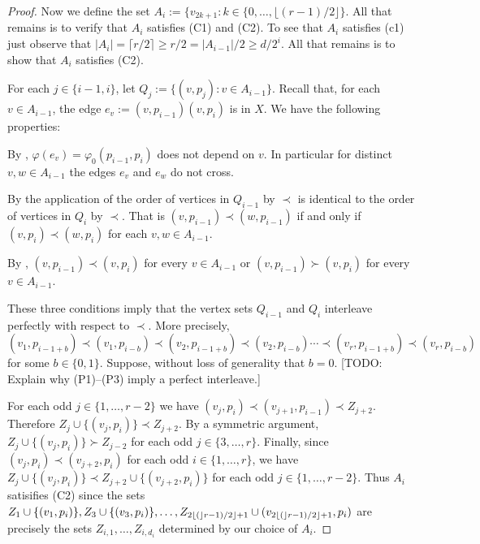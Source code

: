 \documentclass[kpfonts]{patmorin}
\renewcommand{\ge}{\geqslant}
\begin{document}
\begin{proof}
    Now we define the set $A_i:=\{v_{2k+1}:k\in\{0,\ldots,\lfloor(r-1)/2\rfloor\}$.  All that remains is to verify that $A_i$ satisfies (C1) and (C2).  To see that $A_i$ satisfies (c1) just observe that $|A_i|=\lceil r/2\rceil \ge r/2= |A_{i-1}|/2\ge d/2^{i}$.  All that remains is to show that $A_i$ satisfies (C2).

    For each $j\in\{i-1,i\}$, let $Q_j:=\{(v,p_j):v\in A_{i-1}\}$.
    Recall that, for each $v\in A_{i-1}$, the edge $e_v:=(v,p_{i-1})(v,p_i)$ is in $X$.  We have the following properties:
    \begin{compactenum}[(P1)]
        \item By , $\varphi(e_v)=\varphi_0(p_{i-1},p_i)$ does not depend on $v$.  In particular for distinct $v,w\in A_{i-1}$ the edges $e_v$ and $e_w$ do not cross.
        \item By the application of  the order of vertices in $Q_{i-1}$ by $\prec$ is identical to the order of vertices in $Q_i$ by $\prec$.  That is $(v,p_{i-1})\prec (w,p_{i-1})$ if and only if $(v,p_{i})\prec (w,p_{i})$ for each $v,w\in A_{i-1}$.
        \item By , $(v,p_{i-1})\prec (v,p_i)$ for every $v\in A_{i-1}$ or $(v,p_{i-1})\succ (v,p_i)$ for every $v\in A_{i-1}$.
    \end{compactenum}
    These three conditions imply that the vertex sets $Q_{i-1}$ and $Q_{i}$ interleave perfectly with respect to $\prec$. More precisely,
    \[
        (v_1,p_{i-1+b})\prec (v_1,p_{i-b}) \prec (v_2,p_{i-1+b}) \prec (v_2,p_{i-b}) \cdots \prec (v_r,p_{i-1+b}) \prec (v_r,p_{i-b})
    \]
    for some $b\in\{0,1\}$.  Suppose, without loss of generality that $b=0$. [TODO: Explain why (P1)--(P3) imply a perfect interleave.]

    For each odd $j\in\{1,\ldots,r-2\}$ we have $(v_j,p_i)\prec (v_{j+1},p_{i-1}) \prec Z_{j+2}$.  Therefore $Z_j\cup\{(v_j,p_i)\} \prec Z_{j+2}$.  By a symmetric argument, $Z_j\cup\{(v_j,p_i)\} \succ Z_{j-2}$ for each odd $j\in\{3,\ldots,r\}$.  Finally, since $(v_{j},p_i)\prec (v_{j+2},p_i)$ for each odd $i\in\{1,\ldots,r\}$, we have $Z_{j}\cup\{(v_j,p_i)\} \prec Z_{j+2}\cup\{(v_{j+2},p_i)\}$ for each odd $j\in\{1,\ldots,r-2\}$.  Thus $A_i$ satisifies (C2) since the sets $Z_1\cup\{(v_1,p_i)\},Z_3\cup\{(v_3,p_i)\},\ldots,Z_{2{\lfloor ( \rfloor}r-1)/2\rfloor+1} \cup (v_{2{\lfloor ( \rfloor}r-1)/2\rfloor+1},p_i)$ are precisely the sets $Z_{i,1},\ldots,Z_{i,d_i}$ determined by our choice of $A_i$.
\end{proof}
\end{document}
